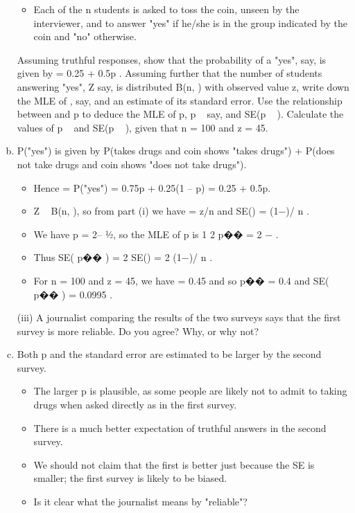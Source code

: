 \documentclass[a4paper,12pt]{article}
\begin{document}
\begin{enumerate}[(a)]
\begin{framed}
\begin{itemize}
\item Each of the n students is asked to toss the coin, unseen by the interviewer, and
to answer "yes" if he/she is in the group indicated by the coin and "no"
otherwise.
\end{itemize}
Assuming truthful responses, show that the probability of a "yes", \theta say, is
given by
\theta = 0.25 + 0.5p .
Assuming further that the number of students answering "yes", Z say, is
distributed B(n, \theta ) with observed value z, write down the MLE of \theta,  say,
and an estimate of its standard error. Use the relationship between \theta and p to
deduce the MLE of p, p ~ say, and SE(p ~ ). Calculate the values of p ~ and
SE(p ~ ), given that n = 100 and z = 45.
\end{framed}

\item P("yes") is given by P(takes drugs and coin shows "takes drugs") + P(does not
take drugs and coin shows "does not take drugs").
\begin{itemize}
    \item Hence \theta = P("yes") = 0.75p + 0.25(1 – p) = 0.25 + 0.5p.
    \item Z ~ B(n, \theta ), so from part (i) we have  = z/n and SE() =  (1−)/ n .
    \item We have p = 2\theta – ½, so the MLE of p is 1
2
p�� = 2 − .
    \item Thus SE( p�� ) = 2 SE() = 2  (1−)/ n .
    \item For n = 100 and z = 45, we have  = 0.45 and so p�� = 0.4 and SE( p�� ) = 0.0995 .
\end{itemize}
\newpage

\begin{framed}
(iii) A journalist comparing the results of the two surveys says that the first survey
is more reliable. Do you agree? Why, or why not?

\end{framed}
\item Both p and the standard error are estimated to be larger by the second survey.
\begin{itemize}
    \item The larger p is plausible, as some people are likely not to admit to taking drugs when
asked directly as in the first survey.
    \item There is a much better expectation of truthful
answers in the second survey.
    \item We should not claim that the first is better just because
the SE is smaller; the first survey is likely to be biased. 
    \item Is it clear what the journalist
means by "reliable"?
\end{itemize}

\end{enumerate}
\end{document}
